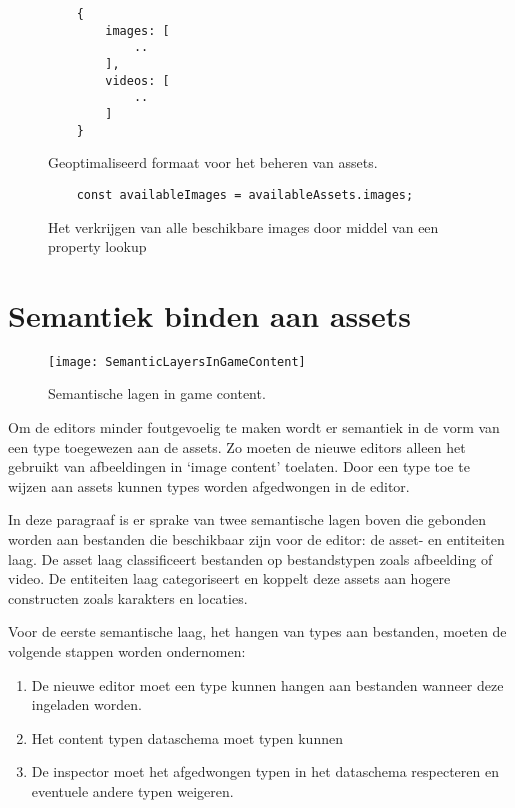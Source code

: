 \begin{figure}[htb]
    \centering
    \lstset{language=JavaScript}
    \begin{lstlisting}
    {
        images: [
            ..
        ],
        videos: [
            ..
        ]
    }
    \end{lstlisting}
    \caption{Geoptimaliseerd formaat voor het beheren van assets.}
    \label{lst:optimizedmanageformat}
\end{figure}

\begin{figure}[htb]
    \centering
    \lstset{language=JavaScript}
    \begin{lstlisting}
    const availableImages = availableAssets.images;
    \end{lstlisting}
    \caption{Het verkrijgen van alle beschikbare images door middel van een property lookup}
    \label{lst:propertylookup}
\end{figure}

\section{Semantiek binden aan assets}

\begin{wrapfigure}{r}{0.35\textwidth}
    \texttt{[image: SemanticLayersInGameContent]}
    \caption{Semantische lagen in game content.}
    \label{fig:semanticgamecontentlayers}
    \centering
\end{wrapfigure}

Om de editors minder foutgevoelig te maken wordt er semantiek in de vorm van een type toegewezen aan de assets. Zo moeten de nieuwe editors alleen het gebruikt van afbeeldingen in ‘image content’ toelaten. Door een type toe te wijzen aan assets kunnen types worden afgedwongen in de editor. 

In deze paragraaf is er sprake van twee semantische lagen boven die gebonden worden aan bestanden die beschikbaar zijn voor de editor: de asset- en entiteiten laag. De asset laag classificeert bestanden op bestandstypen zoals afbeelding of video. De entiteiten laag categoriseert en koppelt deze assets aan hogere constructen zoals karakters en locaties. 

Voor de eerste semantische laag, het hangen van types aan bestanden, moeten de volgende stappen worden ondernomen:

\begin{enumerate}
    \item De nieuwe editor moet een type kunnen hangen aan bestanden wanneer deze ingeladen worden.
    \item Het content typen dataschema moet typen kunnen \item De inspector moet het afgedwongen typen in het dataschema respecteren en eventuele andere typen weigeren.
\end{enumerate}

